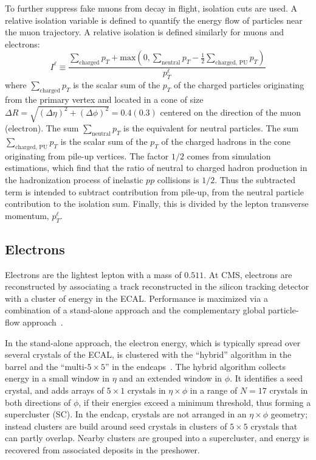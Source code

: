 To further suppress fake muons from decay in flight, isolation cuts are used. A relative isolation variable is defined to quantify the energy flow of particles near the muon trajectory.
A relative isolation is defined similarly for muons and electrons:
\begin{equation}
    I^\ell \equiv \frac{\sum_{\text{charged}} p_{T} + \text{max}\left( 0, \sum_{\text{neutral}} p_{T} - \frac{1}{2}  \sum_{\text{charged, PU}} p_{T}  \right)}{p_{T}^\ell}
    \label{eqn:definition-relative-isolation}
\end{equation}
where $\sum_{\text{charged}} p_{T}$ is the scalar sum of the $p_{T}$ of the charged particles originating from the primary vertex and located in a cone of size $\Delta R = \sqrt{(\Delta \eta)^2 + (\Delta \phi)^2} = 0.4 (0.3)$ centered on the direction of the muon (electron). The sum $\sum_{\text{neutral}} p_{T}$ is the equivalent for neutral particles. The sum $\sum_{\text{charged, PU}} p_{T}$ is the scalar sum of the $p_{T}$ of the charged hadrons in the cone originating from pile-up vertices. The factor $1/2$ comes from simulation estimations, which find that the ratio of neutral to charged hadron production in the hadronization process of inelastic $pp$ collisions is $1/2$. Thus the subtracted term is intended to subtract contribution from pile-up, from the neutral particle contribution to the isolation sum. Finally, this is divided by the lepton transverse momentum, $p_{T}^\ell$. 


\subsection{Electrons}
Electrons are the lightest lepton with a mass of $0.511$\MeV. At CMS, electrons are reconstructed by associating a track reconstructed in the silicon tracking detector with a cluster of energy in the ECAL. Performance is maximized via a combination of a stand-alone approach and the complementary global particle-flow approach~\citep{JINST-2015-10-P06005}. 

In the stand-alone approach, the electron energy, which is typically spread over several crystals of the ECAL, is clustered with the ``hybrid'' algorithm in the barrel and the ``multi-$5\times 5$'' in the endcaps~\citep{JINST-2015-10-P06005}. The hybrid algorithm collects energy in a small window in $\eta$ and an extended window in $\phi$. It identifies a seed crystal, and adds arrays of $5 \times 1$ crystals in $\eta \times \phi$ in a range of $N = 17$ crystals in both directions of $\phi$, if their energies exceed a minimum threshold, thus forming a supercluster (SC).  In the endcap, crystals are not arranged in an $\eta \times \phi$ geometry; instead clusters are build around seed crystals in clusters of $5\times 5$ crystals that can partly overlap. Nearby clusters are grouped into a supercluster, and energy is recovered from associated deposits in the preshower. 

